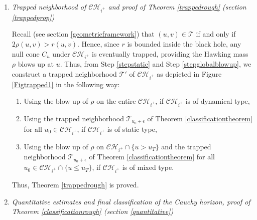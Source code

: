 \documentclass[10pt,a4paper]{article}
\theoremstyle{plain}
\theoremstyle{remark}
\newtheorem{rmk}{Remark}[section]
\newcommand{\T}{\mathcal{T}}
\theoremstyle{definition}
\theoremstyle{plain}
\theoremstyle{remark}
\theoremstyle{definition}
\newcommand{\CH}{\mathcal{CH}_{i^+}}
\numberwithin{equation}{section}
\begin{document}
\begin{enumerate}
	\begin{rmk}
		Lemma \ref{massblowuplemma} is in fact independent of the other results, and can be used alone, as for instance in \cite{r=0}.
	\end{rmk} Thus, using Step \ref{steplocalblowup}, we prove that the Hawking mass $\rho$ blows up on \begin{enumerate}
	\item  $\CH$, if $\CH$ is of dynamical type.
	\item $\CH \cap \{ u > u_T \}$ if $\CH$ is of mixed type, where $u_T$ is the transition time.
\end{enumerate} 
Then, invoking the (preliminary)  classification of Step \ref{stepfirstclassification}, we obtain a proof of Theorem \ref{blowuprough}: if $u_0$ is a Dafermos point i.e.\ $u_0 \notin S_0$, then either $\CH$ is of dynamical type, or $\CH$ is of mixed type and $u_0 >u_T$. In any case, the Hawking mass $\rho$ blows up on $\CH$ at any $u \geq u_0$.

\item \textit{Trapped neighborhood of $\CH$ and proof of Theorem \ref{trappedrough} (section \ref{trappedprop})}

Recall (see section \ref{geometricframework}) that $(u,v) \in \T$ if and only if $2\rho(u,v)>r(u,v)$. Hence, since $r$ is bounded inside the black hole, any null cone $C_{u}$ under $\CH$ is eventually trapped, providing the Hawking mass $\rho$ blows up at $u$. Thus, from Step \ref{stepstatic} and Step \ref{stepglobalblowup}, we construct a trapped neighborhood $\mathcal{T}'$ of $\CH$ as depicted in Figure \ref{Figtrapped1} in the following way: \begin{enumerate}
	\item Using the blow up of $\rho$ on the entire $\CH$, if $\CH$ is of dynamical type,
	\item Using the trapped neighborhood $\mathcal{T}_{u_0+\epsilon}$ of Theorem \ref{classificationtheorem} for all $u_0 \in \CH$, if $\CH$ is of static type,
	\item Using the blow up of $\rho$ on $\CH \cap \{ u >u_T \}$ and the trapped neighborhood $\mathcal{T}_{u_0+\epsilon}$ of Theorem \ref{classificationtheorem} for all $u_0 \in \CH \cap \{ u  \leq u_T \}$, if $\CH$ is of mixed type.
\end{enumerate} Thus, Theorem \ref{trappedrough} is proved.



\item \textit{Quantitative estimates and final classification of the Cauchy horizon, proof of Theorem \ref{classificationrough} (section \ref{quantitative})}



\end{enumerate}
\end{document}
